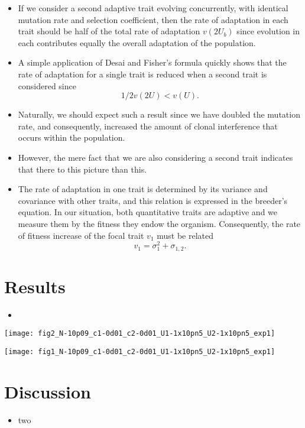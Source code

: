 \documentclass[12pt,one column]{article}
\begin{document}
\begin{itemize}
\begin{itemize}
	\item If we consider a second adaptive trait evolving concurrently, with identical mutation rate and selection coefficient, then the rate of adaptation in each trait should be half of the total rate of adaptation $v(2U_b)$ since evolution in each contributes equally the overall adaptation of the population. 
	\item A simple application of Desai and Fisher’s formula quickly shows that the rate of adaptation for a single trait is reduced when a second trait is considered since \[ 1/2  v(2U)<v(U). \]
	\item Naturally, we should expect such a result since we have doubled the mutation rate, and consequently, increased the amount of clonal interference that occurs within the population. 
	\item However, the mere fact that we are also considering a second trait indicates that there to this picture than this.
	\item The rate of adaptation in one trait is determined by its variance and covariance with other traits, and this relation is expressed in the breeder’s equation. In our situation, both quantitative traits are adaptive and we measure them by the fitness they endow the organism. Consequently, the rate of fitness increase of the focal trait $v_1$ must be related \[v_1=\sigma_1^2+\sigma_{1,2}.\]
	\end{itemize}
\end{itemize}

\section*{Results}
\begin{itemize}
	\item 
\end{itemize}

{\centering
\texttt{[image: fig2\_N-10p09\_c1-0d01\_c2-0d01\_U1-1x10pn5\_U2-1x10pn5\_exp1]}
\label{fig.1}}

{\centering
\texttt{[image: fig1\_N-10p09\_c1-0d01\_c2-0d01\_U1-1x10pn5\_U2-1x10pn5\_exp1]}
\label{fig.2}}

\section*{Discussion}
\begin{itemize}
	\item two
\end{itemize}
\end{document}

